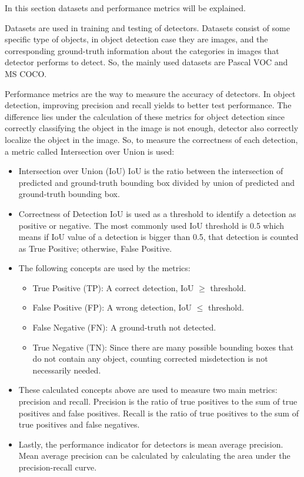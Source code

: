 \documentclass{article}
\begin{document}
\setlength{\parindent}{6ex}

\indent

In this section datasets and performance metrics will be explained. \par 
Datasets are used in training and testing of detectors. Datasets consist of some 
specific type of objects, in object detection case they are images, and the 
corresponding ground-truth information about the categories in images that 
detector performs to detect. So, the mainly used datasets are Pascal VOC and 
MS COCO. \par

Performance metrics are the way to measure the accuracy of detectors. In object 
detection, improving precision and recall yields to better test performance. The 
difference lies under the calculation of these metrics for object detection since 
correctly classifying the object in the image is not enough, detector also correctly 
localize the object in the image. So, to measure the correctness of each detection, 
a metric called Intersection over Union is used:
\begin{itemize}
    \item Intersection over Union (IoU)
    IoU is the ratio between the intersection of predicted and ground-truth bounding box 
    divided by union of predicted and ground-truth bounding box. 
    \item Correctness of Detection
    IoU is used as a threshold to identify a detection as positive or negative. The 
    most commonly used IoU threshold is 0.5 which means if IoU value of a detection is 
    bigger than 0.5, that detection is counted as True Positive; otherwise, False Positive.
    \item The following concepts are used by the metrics:
    \begin{itemize}
        \item True Positive (TP): A correct detection, IoU $\geq$ threshold. 
        \item False Positive (FP): A wrong detection, IoU $\leq$ threshold.
        \item False Negative (FN): A ground-truth not detected.
        \item True Negative (TN): Since there are many possible bounding boxes that 
        do not contain any object, counting corrected misdetection is not necessarily 
        needed.
    \end{itemize}
    \item These calculated concepts above are used to measure two main metrics: precision and 
    recall. Precision is the ratio of true positives to the sum of true positives and false 
    positives. Recall is the ratio of true positives to the sum of true positives and false 
    negatives.
    \item Lastly, the performance indicator for detectors is mean average precision. Mean 
    average precision can be calculated by calculating the area under the precision-recall curve.
\end{itemize}
\end{document}
